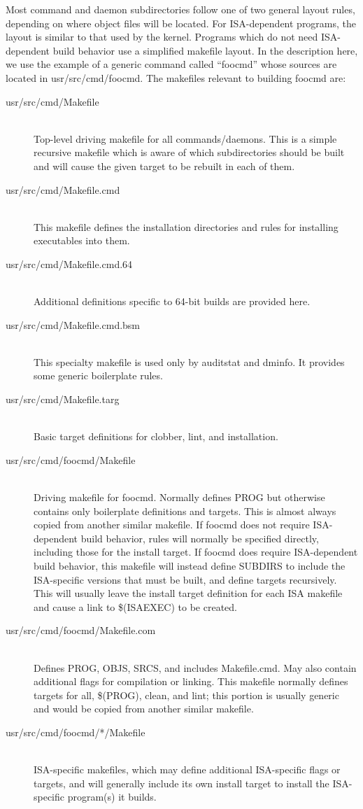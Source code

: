 \documentclass{article}
\begin{document}
Most command and daemon subdirectories follow one of two general layout rules,
depending on where object files will be located. For ISA-dependent programs, the
layout is similar to that used by the kernel. Programs which do not need
ISA-dependent build behavior use a simplified makefile layout. In the
description here, we use the example of a generic command called ``foocmd''
whose sources are located in usr/src/cmd/foocmd. The makefiles relevant to
building foocmd are:

\begin{description}
\item[usr/src/cmd/Makefile] \hfill \\
  Top-level driving makefile for all commands/daemons. This is a simple
  recursive makefile which is aware of which subdirectories should be built and
  will cause the given target to be rebuilt in each of them.
\item[usr/src/cmd/Makefile.cmd] \hfill \\
 This makefile defines the installation directories and rules for installing
 executables into them.
\item[usr/src/cmd/Makefile.cmd.64] \hfill \\
 Additional definitions specific to 64-bit builds are provided here.
\item[usr/src/cmd/Makefile.cmd.bsm] \hfill \\
  This specialty makefile is used only by auditstat and dminfo. It provides some
  generic boilerplate rules.
\item[usr/src/cmd/Makefile.targ] \hfill \\
 Basic target definitions for clobber, lint, and installation.
\item[usr/src/cmd/foocmd/Makefile] \hfill \\
  Driving makefile for foocmd. Normally defines PROG but otherwise contains only
  boilerplate definitions and targets. This is almost always copied from another
  similar makefile. If foocmd does not require ISA-dependent build behavior,
  rules will normally be specified directly, including those for the install
  target. If foocmd does require ISA-dependent build behavior, this makefile
  will instead define SUBDIRS to include the ISA-specific versions that must be
  built, and define targets recursively. This will usually leave the install
  target definition for each ISA makefile and cause a link to \$(ISAEXEC) to be
  created.
\item[usr/src/cmd/foocmd/Makefile.com] \hfill \\
 Defines PROG, OBJS, SRCS, and includes Makefile.cmd. May also contain
 additional flags for compilation or linking. This makefile normally defines
 targets for all, \$(PROG), clean, and lint; this portion is usually generic and
 would be copied from another similar makefile.
\item[usr/src/cmd/foocmd/*/Makefile] \hfill \\
 ISA-specific makefiles, which may define additional ISA-specific flags or
 targets, and will generally include its own install target to install the
 ISA-specific program(s) it builds.
\end{description}
\end{document}
